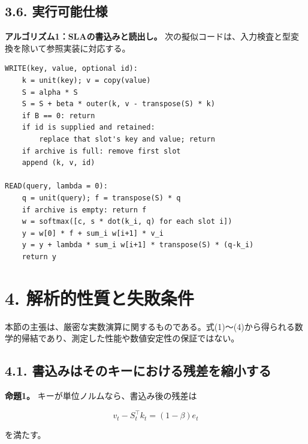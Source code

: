 \documentclass[11pt,a4paper]{article}
\begin{document}

\subsection{3.6. 実行可能仕様}\label{ux5b9fux884cux53efux80fdux4ed5ux69d8}

\textbf{アルゴリズム1：SLAの書込みと読出し。} 次の擬似コードは、入力検査と型変換を除いて参照実装に対応する。

\begin{minipage}{\linewidth}

\begin{verbatim}
WRITE(key, value, optional id):
    k = unit(key); v = copy(value)
    S = alpha * S
    S = S + beta * outer(k, v - transpose(S) * k)
    if B == 0: return
    if id is supplied and retained:
        replace that slot's key and value; return
    if archive is full: remove first slot
    append (k, v, id)

READ(query, lambda = 0):
    q = unit(query); f = transpose(S) * q
    if archive is empty: return f
    w = softmax([c, s * dot(k_i, q) for each slot i])
    y = w[0] * f + sum_i w[i+1] * v_i
    y = y + lambda * sum_i w[i+1] * transpose(S) * (q-k_i)
    return y
\end{verbatim}

\end{minipage}

\section{4. 解析的性質と失敗条件}\label{ux89e3ux6790ux7684ux6027ux8ceaux3068ux5931ux6557ux6761ux4ef6}

本節の主張は、厳密な実数演算に関するものである。式(1)〜(4)から得られる数学的帰結であり、測定した性能や数値安定性の保証ではない。

\subsection{4.1. 書込みはそのキーにおける残差を縮小する}\label{ux66f8ux8fbcux307fux306fux305dux306eux30adux30fcux306bux304aux3051ux308bux6b8bux5deeux3092ux7e2eux5c0fux3059ux308b}

\textbf{命題1。} キーが単位ノルムなら、書込み後の残差は

\nopagebreak[4]

\[
v_t-S_t^{\top}k_t=(1-\beta)e_t
\tag{6}
\]

を満たす。
\end{document}
